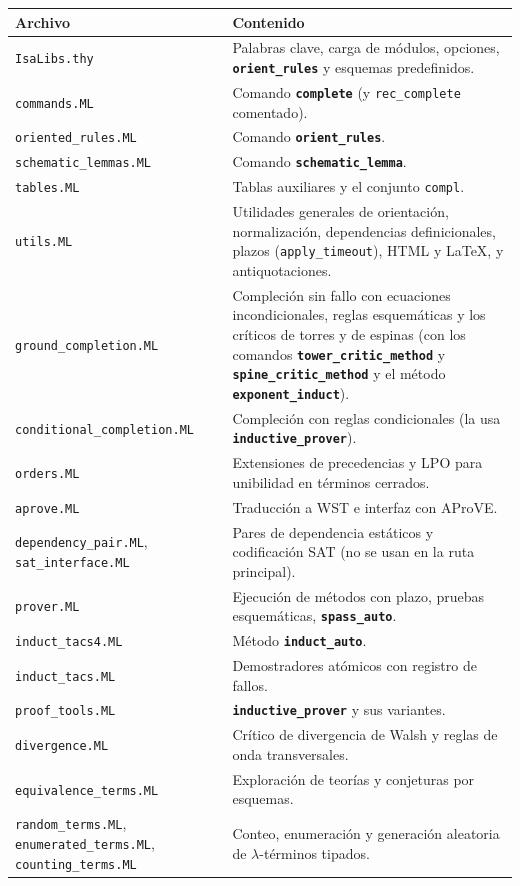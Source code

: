\documentclass[11pt,a4paper]{article}
\newcommand{\isa}[1]{\texttt{#1}}
\newcommand{\cmd}[1]{\textbf{\texttt{#1}}}
\theoremstyle{definition}
\theoremstyle{remark}
\begin{document}
\begin{longtable}{@{}p{4.3cm}p{10.4cm}@{}}
\toprule
\textbf{Archivo} & \textbf{Contenido}\\
\midrule
\endhead
\isa{IsaLibs.thy} & Palabras clave, carga de módulos, opciones, \cmd{orient\_rules} y esquemas predefinidos.\\
\isa{commands.ML} & Comando \cmd{complete} (y \isa{rec\_complete} comentado).\\
\isa{oriented\_rules.ML} & Comando \cmd{orient\_rules}.\\
\isa{schematic\_lemmas.ML} & Comando \cmd{schematic\_lemma}.\\
\isa{tables.ML} & Tablas auxiliares y el conjunto \isa{compl}.\\
\isa{utils.ML} & Utilidades generales de orientación, normalización, dependencias definicionales, plazos (\isa{apply\_timeout}), HTML y \LaTeX, y antiquotaciones.\\
\isa{ground\_completion.ML} & Compleción sin fallo con ecuaciones incondicionales, reglas esquemáticas y los críticos de torres y de espinas (con los comandos \cmd{tower\_critic\_method} y \cmd{spine\_critic\_method} y el método \cmd{exponent\_induct}).\\
\isa{conditional\_completion.ML} & Compleción con reglas condicionales (la usa \cmd{inductive\_prover}).\\
\isa{orders.ML} & Extensiones de precedencias y LPO para unibilidad en términos cerrados.\\
\isa{aprove.ML} & Traducción a WST e interfaz con AProVE.\\
\isa{dependency\_pair.ML}, \isa{sat\_interface.ML} & Pares de dependencia estáticos y codificación SAT (no se usan en la ruta principal).\\
\isa{prover.ML} & Ejecución de métodos con plazo, pruebas esquemáticas, \cmd{spass\_auto}.\\
\isa{induct\_tacs4.ML} & Método \cmd{induct\_auto}.\\
\isa{induct\_tacs.ML} & Demostradores atómicos con registro de fallos.\\
\isa{proof\_tools.ML} & \cmd{inductive\_prover} y sus variantes.\\
\isa{divergence.ML} & Crítico de divergencia de Walsh y reglas de onda transversales.\\
\isa{equivalence\_terms.ML} & Exploración de teorías y conjeturas por esquemas.\\
\isa{random\_terms.ML}, \isa{enumerated\_terms.ML}, \isa{counting\_terms.ML} & Conteo, enumeración y generación aleatoria de $\lambda$-términos tipados.\\

\end{longtable}
\end{document}
